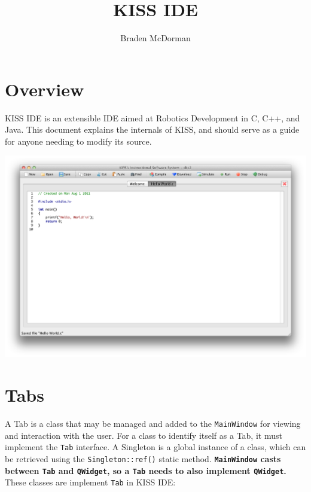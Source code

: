 \documentclass[7pt,letterpaper]{article}
\title{KISS IDE}
\author{Braden McDorman}
\newcommand{\code}[1]{\texttt{#1}}
\begin{document}
	\makeatletter
	\noindent\begin{minipage}[l]{.8\textwidth}\begin{flushleft}\begin{small}
	\par\@author\vspace{.5em}
	
	\authInfo
	\end{small}\end{flushleft}\end{minipage}\vspace{.25in}
	
	\begin{center}
	\begin{Large}
	\textbf{\@title}
	\end{Large}
	\end{center}
	\makeatother
	
	\section{Overview}

	KISS IDE is an extensible IDE aimed at Robotics Development in C, C++, and Java. This document explains the internals of KISS, and should serve as
	a guide for anyone needing to modify its source.
	
	\includegraphics[width=1\textwidth]{KISS.png}

	\section{Tabs}
	
	A Tab is a class that may be managed and added to the \code{MainWindow} for viewing and interaction with the user. 
	For a class to identify itself as a Tab, it must implement the \code{Tab} interface.
	A Singleton is a global instance of a class, which can be retrieved using the \code{Singleton::ref()} static method.
	\textbf{\code{MainWindow} casts between \code{Tab} and \code{QWidget}, so a \code{Tab} needs to also implement \code{QWidget}.}
	These classes are implement \code{Tab} in KISS IDE:
	
\end{document}
